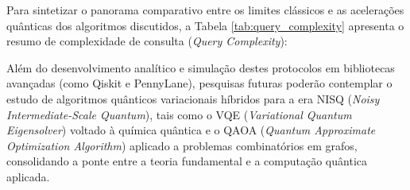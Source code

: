 \documentclass[12pt, a4paper]{article}
\begin{document}
Para sintetizar o panorama comparativo entre os limites clássicos e as acelerações quânticas dos algoritmos discutidos, a Tabela \ref{tab:query_complexity} apresenta o resumo de complexidade de consulta (\textit{Query Complexity}):

\begin{table}[ht]
    \centering
    \caption{Quadro comparativo da complexidade assintótica de consulta entre modelos clássicos e quânticos.}
    \label{tab:query_complexity}
\end{table}

Além do desenvolvimento analítico e simulação destes protocolos em bibliotecas avançadas (como Qiskit e PennyLane), pesquisas futuras poderão contemplar o estudo de algoritmos quânticos variacionais híbridos para a era NISQ (\textit{Noisy Intermediate-Scale Quantum}), tais como o VQE (\textit{Variational Quantum Eigensolver}) voltado à química quântica e o QAOA (\textit{Quantum Approximate Optimization Algorithm}) aplicado a problemas combinatórios em grafos, consolidando a ponte entre a teoria fundamental e a computação quântica aplicada.

\printbibliography
\end{document}
